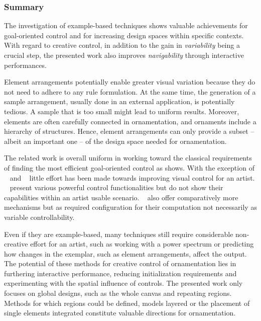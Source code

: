 
\subsubsection{Summary}
\label{subsec:analysis_example_based_summary}

The investigation of example-based techniques shows valuable achievements for goal-oriented control and for increasing design spaces within specific contexts. With regard to creative control, in addition to the gain in \textit{variability} being a crucial step, the presented work also improves \textit{navigability} through interactive performances.

Element arrangements potentially enable greater visual variation because they do not need to adhere to any rule formulation. At the same time, the generation of a sample arrangement, usually done in an external application, is potentially tedious. A sample that is too small might lead to uniform results. Moreover, elements are often carefully connected in ornamentation, and ornaments include a hierarchy of structures. Hence, element arrangements can only provide a subset – albeit an important one – of the design space needed for ornamentation.

The related work is overall uniform in working toward the classical requirements of finding the most efficient goal-oriented control as  shows. With the exception of \citeauthor*{ijiri_2008_aeb}~\cite{ijiri_2008_aeb} and \citeauthor*{galerne_2012_gne}~\cite{galerne_2012_gne} little effort has been made towards improving visual control for an artist. \citeauthor*{ma_2013_det}~\cite{ma_2013_det} present various powerful control functionalities but do not show their capabilities within an artist usable scenario. \citeauthor*{gilet_2012_map}~\cite{gilet_2012_map} also offer comparatively more mechanisms but as required configuration for their computation not necessarily as variable controllability.

Even if they are example-based, many techniques still require considerable non-creative effort for an artist, such as working with a power spectrum or predicting how changes in the exemplar, such as element arrangements, affect the output. The potential of these methods for creative control of ornamentation lies in furthering interactive performance, reducing initialization requirements and experimenting with the spatial influence of controls. The presented work only focuses on global designs, such as the whole canvas and repeating regions. Methods for which regions could be defined, models layered or the placement of single elements integrated constitute valuable directions for ornamentation.





